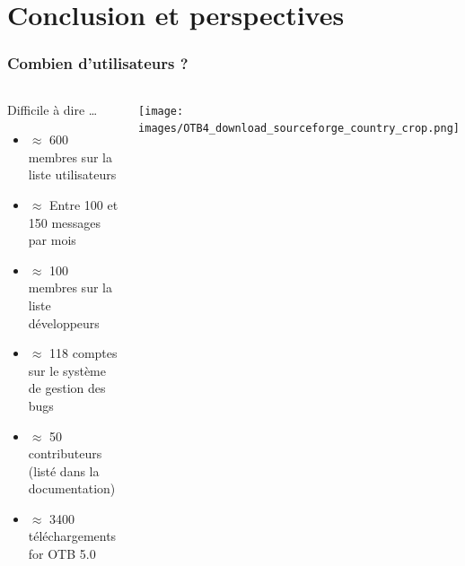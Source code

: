 \documentclass[8pt]{beamer}
\begin{document}
\section{Conclusion et perspectives}
\begin{frame}
\frametitle{Combien d'utilisateurs ?}
\begin{columns}[c]
\begin{block}{Difficile à dire \ldots}
\begin{itemize}
    \item $\approx$ 600 membres sur la liste utilisateurs
    \item $\approx$ Entre 100 et 150 messages par mois
    \item $\approx$ 100 membres sur la liste développeurs
    \item $\approx$ 118 comptes sur le système de gestion des bugs
    \item $\approx$ 50 contributeurs (listé dans la documentation)
    \item $\approx$ 3400 téléchargements for OTB 5.0
  \end{itemize}
\end{block}
\texttt{[image: images/OTB4\_download\_sourceforge\_country\_crop.png]}
\end{columns}
\end{frame}
\end{document}
